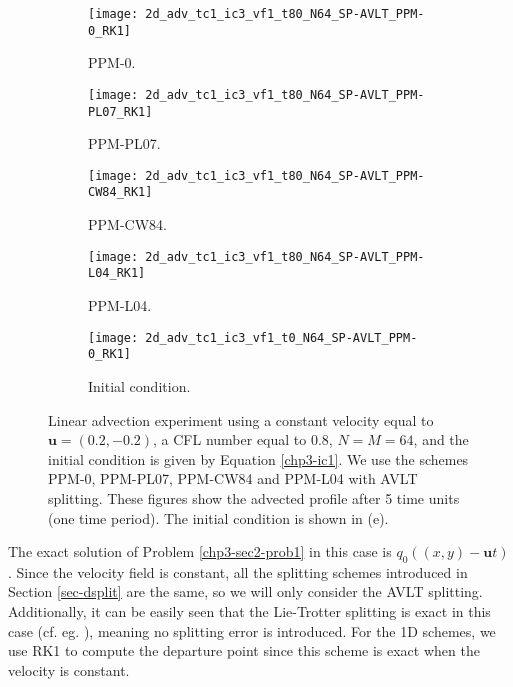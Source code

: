 \begin{figure}[!htb]
	\centering
	\begin{subfigure}{0.4\textwidth}
		\centering
		\texttt{[image: 2d\_adv\_tc1\_ic3\_vf1\_t80\_N64\_SP-AVLT\_PPM-0\_RK1]}
		\caption{PPM-0.\label{chp3-sec-exp-adv1-a}}
	\end{subfigure}
	\begin{subfigure}{0.4\textwidth}
		\centering
		\texttt{[image: 2d\_adv\_tc1\_ic3\_vf1\_t80\_N64\_SP-AVLT\_PPM-PL07\_RK1]}
		\caption{PPM-PL07.\label{chp3-sec-exp-adv1-b}}
	\end{subfigure}
	
	\begin{subfigure}{0.4\textwidth}
		\centering
		\texttt{[image: 2d\_adv\_tc1\_ic3\_vf1\_t80\_N64\_SP-AVLT\_PPM-CW84\_RK1]}
		\caption{PPM-CW84.\label{chp3-sec-exp-adv1-c}}
	\end{subfigure}
	\begin{subfigure}{0.4\textwidth}
		\centering
		\texttt{[image: 2d\_adv\_tc1\_ic3\_vf1\_t80\_N64\_SP-AVLT\_PPM-L04\_RK1]}
		\caption{PPM-L04.\label{chp3-sec-exp-adv1-d}}
	\end{subfigure} 

	\begin{subfigure}{0.4\textwidth}
	\centering
	\texttt{[image: 2d\_adv\_tc1\_ic3\_vf1\_t0\_N64\_SP-AVLT\_PPM-0\_RK1]}
	\caption{Initial condition.\label{chp3-sec-exp-adv1-e}}
	\end{subfigure} 

	\caption{Linear advection experiment using a constant velocity equal to 
		$\boldsymbol{u} = (0.2,-0.2)$,
		a CFL number equal to $0.8$, $N=M=64$, and the initial condition is given by Equation \eqref{chp3-ic1}.
		We use the schemes PPM-0, PPM-PL07, PPM-CW84 and PPM-L04 with AVLT splitting.
		These figures show the advected profile after 5 time units (one time period).
		The initial condition is shown in (e).
		\label{chp3-sec-exp-adv1}}
\end{figure}

The exact solution of Problem \ref{chp3-sec2-prob1} in this case is 
$q_0((x,y)-\boldsymbol{u}t)$. Since the velocity field is constant, all the splitting 
schemes introduced in Section \ref{sec-dsplit} are 
the same, so we will only consider the AVLT splitting. 
Additionally, it can be easily seen that the Lie-Trotter splitting is exact in 
this case (cf. eg. \cite[p.~202-203]{leveque:1990}), meaning no splitting error is introduced.
For the 1D schemes, we use RK1 to compute 
the departure point since this scheme is exact when the velocity is constant.

